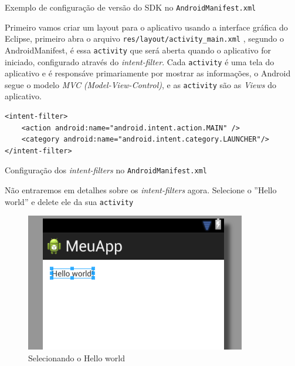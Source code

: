 \documentclass[a4paper,12pt,brazil,doubleside]{book}
\begin{document}
\begin{singlespace}
\begin{listing}[H]
\inputminted[linenos=true,fontsize=\small,frame=lines, framesep=2mm, tabsize=2,numbersep=5pt]{xml}{src/firstapp/sdk-manifest.xml}
\label{AndroidManifest.sdk}
\caption{Exemplo de configuração de versão do SDK no \texttt{\textcolor{mygreen}{AndroidManifest.xml}} }
\end{listing}

Primeiro vamos criar um layout para o aplicativo usando a interface gráfica do Eclipse, primeiro abra o arquivo \texttt{\textcolor{mygreen}{res/layout/activity\_main.xml}} , segundo o AndroidManifest, é essa \texttt{activity} que será aberta quando o aplicativo for iniciado, configurado através do \textit{intent-filter}. Cada \texttt{activity} é uma tela do aplicativo e é responsáve primariamente por mostrar as informações, o Android segue o modelo \emph{MVC} \textit{(Model-View-Control)}, e as \texttt{activity} são as \textit{Views} do aplicativo.
\begin{listing}
\begin{verbatim}
<intent-filter>
	<action android:name="android.intent.action.MAIN" />
	<category android:name="android.intent.category.LAUNCHER"/>
</intent-filter>
\end{verbatim}
\caption{Configuração dos \textit{intent-filters} no \texttt{\textcolor{mygreen}{AndroidManifest.xml}} }
\end{listing}

Não entraremos em detalhes sobre os \textit{intent-filters} agora. Selecione o ''Hello world'' e delete ele da sua \texttt{activity}

\begin{figure}[H]
  \centering
  \includegraphics{figuras/3-criando-app.png}
  \caption{Selecionando o Hello world}
  \label{fig:b}
\end{figure}


\end{singlespace}
\end{document}
